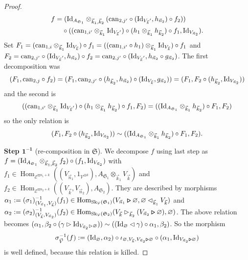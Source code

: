 \documentclass[pdftex]{sigma}%
\numberwithin{equation}{section}
\newcommand{\Hom}{\operatorname{Hom}}
\newcommand{\bmrhd}{\bm{\triangleright}}
\begin{document}
\begin{proof}
\begin{gather*}
\begin{split}
& f = ({\rm Id}_{A_{\mathfrak{S}_1}} \otimes_{\vec{k}_1,\vec{k}_2} ({\rm can}_{2,j'} \circ ({\rm Id}_{{V_{\vec{k}}}'} , h_{\vec{n}_2})\circ f_2)) \\
& \hphantom{f =}{}
\circ (({\rm can}_{1,i'}\otimes_{\vec{k}_1} {\rm Id}_{{V_{\vec{k}}}'}) \circ (h_1 \otimes_{\vec{k}_1} h_{\vec{k}_2})\circ f_1 , {\rm Id}_{V_{\vec{n}_2}}).
\end{split}
\end{gather*}
Set $F_1 = ({\rm can}_{1,i}\otimes_{\vec{k}_1} {\rm Id}_{V_{\vec{k}}}) \circ f_1 = (({\rm can}_{1,i'}\circ h_1)\otimes_{\vec{k}_1} {\rm Id}_{V_{\vec{k}}}) \circ f_1$ and $F_2 = {\rm can}_{2,j'}\circ ({\rm Id}_{{V_{\vec{k}}}'} , h_{\vec{n}_2}) \circ f_2 = {\rm can}_{2,j'}\circ ({\rm Id}_{{V_{\vec{k}}}'} , h_{\vec{n}_2} \circ g_{\vec{n}_2})$. The first decomposition was
\[
(F_1,{\rm can}_{2,j} \circ f_2)= (F_1,{\rm can}_{2,j'}\circ (h_{\vec{k}_2}, h_{\vec{n}_2}) \circ ({\rm Id}_{V_{\vec{k}}}, g_{\vec{n}_2})) = (F_1,F_2 \circ (h_{\vec{k}_2}, {\rm Id}_{V_{\vec{n}_2}}))
\]
and the second is
\[
(({\rm can}_{1,i'}\otimes_{\vec{k}_1} {\rm Id}_{{V_{\vec{k}}}'})\circ (h_1 \otimes_{\vec{k}_1} h_{\vec{k}_2}) \circ f_1,F_2) = (({\rm Id}_{A_{\mathfrak{S}_1}}\otimes_{\vec{k}_1} h_{\vec{k}_2})\circ F_1,F_2)
\]
so the only relation is
\[
(F_1,F_2\circ (h_{\vec{k}_2}, {\rm Id}_{V_{\vec{n}_2}}))\sim (({\rm Id}_{A_{\mathfrak{S}_1}}\otimes_{\vec{k}_1} h_{\vec{k}_2}) \circ F_1,F_2).
\]

\medskip\noindent
\textbf{Step $\boldsymbol{1^{-1}}$} (re-composition in $\mathfrak{S}$). We decompose $f$ using last step as $f = ({\rm Id}_{A_{\mathfrak{S}_1}} \otimes_{\vec{k}_1,\vec{k}_2} f_2) \circ (f_1 , {\rm Id}_{V_{\vec{n}_2}})$ with $f_1\in\Hom_{\mathcal{E}^{\boxtimes n_1+k}}((V_{\vec{n}_1},1_{\mathcal{V}^{\otimes k}}), A_{\mathfrak{S}_1}\otimes_{\vec{k}_1} V_{\vec{k}})$ and $f_2\in\Hom_{\mathcal{E}^{\boxtimes n_2+k}}((V_{\vec{k}},V_{\vec{n}_2}), A_{\mathfrak{S}_2})$. They are described by morphisms $\alpha_1 := (\sigma_1)^{-1}_{(V_{\vec{n}_1},V_{\vec{k}})}(f_1) \in \Hom_{{\rm Sk}_\mathcal{V}(\mathfrak{S}_1)}(V_{\vec{n}_1} \bmrhd \varnothing,\varnothing\lhd_{\vec{k}_1} V_{\vec{k}})$ and $\alpha_2 := (\sigma_2)_{(V_{\vec{k}},V_{\vec{n}_2})}^{-1}(f_2)\in\Hom_{{\rm Sk}_\mathcal{V}(\mathfrak{S}_2)}(V_{\vec{k}}\rhd_{\vec{k}_2}(V_{\vec{n}_2}\bmrhd\varnothing),\varnothing)$. The above relation becomes $(\alpha_1,\beta_2\circ (\gamma\rhd {\rm Id}_{V_{\vec{n}_2}\rhd\varnothing})) \sim (({\rm Id}_\varnothing\lhd\gamma) \circ \alpha_1, \beta_2)$. So the morphism
\[
\sigma_{\vec{V}}^{-1}(f) := ({\rm Id}_\varnothing , \alpha_2) \circ \iota_{\varnothing,V_{\vec{k}},V_{\vec{n}_2}\bmrhd\varnothing} \circ (\alpha_1 , {\rm Id}_{V_{\vec{n}_2}\bmrhd\varnothing})
\]
is well defined, because this relation is killed.


\end{proof}
\end{document}
